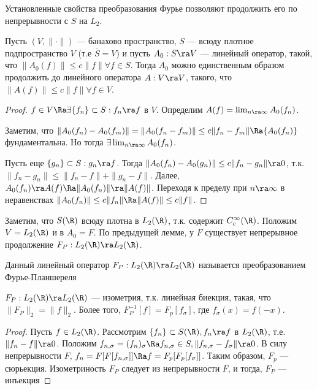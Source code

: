 Установленные свойства преобразования Фурье позволяют продолжить его по непрерывности с \(S\) на \(L_2\).

\begin{lemma}
    Пусть \((V, \|\cdot\|)\) --- банахово пространство, \(S\) --- всюду плотное подпространство \(V\) (т.е \(\overline{S} = V\)) и пусть \(A_0: S \ra V\) --- линейный оператор, такой, что \(\|A_0(f)\| \le c\|f\| \forall f \in S\). Тогда \(A_0\) можно единственным образом продолжить до линейного оператора \(A: V \ra V\), такого, что \(\|A(f)\| \le c\|f\|\forall f \in V\).
\end{lemma}
\begin{proof}
    \(f \in V \Ra \exists \{f_n\} \subset S: f_n \ra f\) в \(V\). Определим \(A(f) = \lim_{n \ra \infty} A_0(f_n)\).

    Заметим, что \(\|A_0(f_n) - A_0(f_m)\| = \|A_0(f_n - f_m)\| \le c\|f_n - f_m\| \Ra \{A_0(f_n)\}\) фундаментальна. Но тогда \(\exists \lim_{n \ra \infty} A_0(f_n)\). 

    Пусть еще \(\{g_n\} \subset S: g_n \ra f\). Тогда \(\|A_0(f_n) - A_0(g_n)\| \le c\|f_n - g_n\| \ra 0\), т.к. \(\|f_n - g_n\| \le \|f_n - f\| + \|g_n - f\|\). Далее, \(A_0(f_n) \ra A(f) \Ra \|A_0(f_n)\| \ra \|A(f)\|\). Переходя к пределу при \(n \ra \infty\) в неравенствах \(\|A_0(f_n)\| \le c\|f_n\| \Ra \|A(f)\| \le c\|f\|\).
\end{proof}

\begin{corollary}
    Заметим, что \(S(\R)\) всюду плотна в \(L_2(\R)\), т.к. содержит \(C_c^\infty(\R)\). Положим \(V = L_2(\R)\) и в \(A_0 = F\). По предыдущей лемме, у \(F\) существует непрерывное продолжение \(F_P: L_2(\R) \ra L_2(\R)\).
\end{corollary}

\begin{definition}
    Данный линейный оператор \(F_P: L_2(\R) \ra L_2(\R)\) называется преобразованием Фурье-Планшереля
\end{definition}

\begin{theorem}
    \(F_P: L_2(\R) \ra L_2(\R)\) --- изометрия, т.к. линейная биекция, такая, что \(\|F_P\|_2 = \|f\|_2\). Более того, \(F^{-1}_P[f] = F_p[f_\sigma]\), где \(f_\sigma(x) = f(-x)\).
    
\end{theorem}
\begin{proof}
    Пусть \(f \in L_2(\R)\). Рассмотрим \(\{f_n\} \subset S(\R), f_n \ra f\) в \(L_2(\R)\), т.е. \(\|f_n - f\| \ra 0\). Положим \(f_{n, \sigma} = (f_n)_{\sigma} \Ra f_{n, \sigma} \in S, \|f_{n, \sigma} - f_\sigma\| \ra 0\). В силу непрерывности \(F\), \(f_n = F[F[f_{n, \sigma}]] \Ra f = F_p[F_p[f_\sigma]]\). Таким образом, \(F_p\) --- сюрьекция. Изометриность \(F_P\) следует из непрерывности \(F\), и тогда, \(F_P\) --- инъекция
\end{proof}

